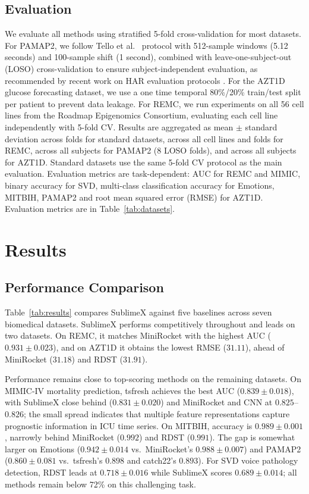 \documentclass[times, review, 10pt]{elsarticle}
\begin{document}
\subsection{Evaluation}
We evaluate all methods using stratified 5-fold cross-validation for most datasets. For PAMAP2, we follow Tello et al.\ \cite{tello2025contrasting} protocol with 512-sample windows
(5.12 seconds) and 100-sample shift (1 second), combined with leave-one-subject-out (LOSO) cross-validation to ensure subject-independent evaluation, as recommended by recent work on
HAR evaluation protocols \cite{tello2025contrasting, geissler2024power}. For the AZT1D glucose forecasting dataset, we use a one time temporal 80\%/20\% train/test split per patient to prevent data leakage.
For REMC, we run experiments on all 56 cell lines from the Roadmap Epigenomics Consortium, evaluating each cell line independently with 5-fold CV.
Results are aggregated as mean $\pm$ standard deviation across folds for standard datasets, across all cell lines and folds for REMC, across
all subjects for PAMAP2 (8 LOSO folds), and across all subjects for AZT1D. Standard datasets use the same 5-fold CV protocol as the main evaluation. Evaluation metrics are task-dependent:
AUC for REMC and MIMIC, binary accuracy for SVD, multi-class classification accuracy for Emotions, MITBIH, PAMAP2 and root mean squared error (RMSE) for AZT1D.
Evaluation metrics are in Table~\ref{tab:datasets}.

\section{Results}

\subsection{Performance Comparison}


Table~\ref{tab:results} compares SublimeX against five baselines across seven biomedical datasets.
SublimeX performs competitively throughout and leads on two datasets.
On REMC, it matches MiniRocket with the highest AUC ($0.931 \pm 0.023$), and on AZT1D it obtains the lowest RMSE ($31.11$), ahead of MiniRocket ($31.18$) and RDST ($31.91$).

Performance remains close to top-scoring methods on the remaining datasets. On MIMIC-IV mortality prediction, tsfresh achieves the best AUC ($0.839 \pm 0.018$), with SublimeX
close behind ($0.831 \pm 0.020$) and MiniRocket and CNN at $0.825$--$0.826$; the small spread
indicates that multiple feature representations capture prognostic information in ICU time series.
On MITBIH, accuracy is $0.989 \pm 0.001$, narrowly behind MiniRocket ($0.992$) and RDST ($0.991$).
The gap is somewhat larger on Emotions ($0.942 \pm 0.014$ vs.\ MiniRocket's $0.988 \pm 0.007$) and PAMAP2 ($0.860 \pm 0.081$ vs.\ tsfresh's $0.898$ and catch22's $0.893$).
For SVD voice pathology detection, RDST leads at $0.718 \pm 0.016$ while SublimeX scores $0.689 \pm 0.014$; all methods remain below 72\% on this challenging task.
\end{document}
